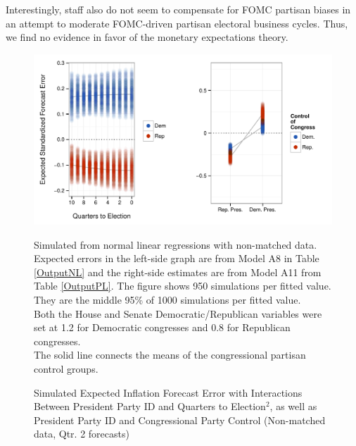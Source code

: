 \documentclass[a4paper]{article}\usepackage{graphicx, color}
\newenvironment{knitrout}{}{} %
\begin{document}
Interestingly, staff also do not seem to compensate for FOMC partisan biases in an attempt to moderate FOMC-driven partisan electoral business cycles. Thus, we find no evidence in favor of the monetary expectations theory.

\begin{figure}[t]
    \caption{Simulated Expected Inflation Forecast Error with Interactions Between President Party ID and Quarters to Election$^{2}$, as well as President Party ID and Congressional Party Control (Non-matched data, Qtr. 2 forecasts)}
    \label{InterPlot}
    \begin{center}

\begin{knitrout}
\color{fgcolor}

{\centering \includegraphics[width=0.95\linewidth]{figure/InterPlot} 

}



\end{knitrout}


    \end{center}
    \begin{singlespace}
        {\scriptsize{Simulated from normal linear regressions with non-matched data. Expected errors in the left-side graph are from Model A8 in Table \ref{OutputNL} and the right-side estimates are from Model A11 from Table \ref{OutputPL}. The figure shows 950 simulations per fitted value. They are the middle 95\% of 1000 simulations per fitted value. \\ Both the House and Senate Democratic/Republican variables were set at 1.2 for Democratic congresses and 0.8 for Republican congresses. \\ The solid line connects the means of the congressional partisan control groups.}}
    \end{singlespace}
\end{figure}
\end{document}
